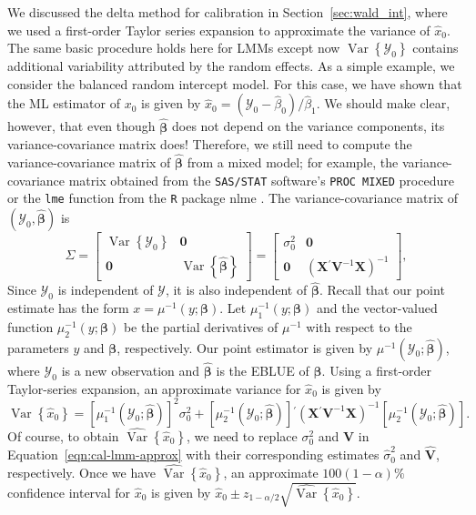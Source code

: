 \documentclass[cmfont,usenames,dvipsnames,leqno]{afit-etd}\usepackage[]{graphicx}\usepackage[]{color}
\newcommand{\code}[1]{\texttt{\small{#1}}}
\newcommand{\pkg}[1]{\textsf{\small{#1}}}
\newcommand{\trans}{\ensuremath{^\prime}}
\newcommand{\bc}[1]{\ensuremath{\bm{\mathcal{#1}}}}
\newcommand{\mc}[1]{\ensuremath{\mathcal{#1}}}
\newcommand{\wh}[1]{\ensuremath{\widehat{#1}}}
\newcommand{\var}{\operatorname{Var}}
\newcommand{\X}{\ensuremath{\bm{X}}}
\begin{document}
We discussed the delta method for calibration in Section~\ref{sec:wald_int}, where we used a first-order Taylor series expansion to approximate the variance of $\wh{x}_0$. The same basic procedure holds here for LMMs except now $\var\left\{\mc{Y}_0\right\}$ contains additional variability attributed by the random effects. As a simple example, we consider the balanced random intercept model. For this case, we have shown that the \ac{ML} estimator of $x_0$ is given by $\wh{x}_0 = \left(\mc{Y}_0 - \wh{\beta}_0\right)/\wh{\beta}_1$. We should make clear, however, that even though $\wh{\bm{\beta}}$ does not depend on the variance components, its variance-covariance matrix does! Therefore, we still need to compute the variance-covariance matrix of $\wh{\bm{\beta}}$ from a mixed model; for example, the variance-covariance matrix obtained from the \code{SAS/STAT} \citep{sas_program} software's \code{PROC MIXED} procedure or the \code{lme} function from the \code{R} package \pkg{nlme} \citep{pinheiro_nlme_2013}. The variance-covariance matrix of $\left(\mc{Y}_0, \wh{\bm{\beta}}\right)$ is
\begin{equation}
\label{eqn:Sigma}
\Sigma = \begin{bmatrix}
           \var\left\{\mc{Y}_0\right\} & \bm{0} \\
           \bm{0} & \var\left\{\wh{\bm{\beta}}\right\}
         \end{bmatrix} = \begin{bmatrix}
           \sigma_0^2 & \bm{0} \\
           \bm{0} & \left(\X\trans\bm{V}^{-1}\X\right)^{-1}
         \end{bmatrix},
\end{equation} 
Since $\mc{Y}_0$ is independent of $\bc{Y}$, it is also independent of $\wh{\bm{\beta}}$. Recall that our point estimate has the form $x = \mu^{-1}\left(y; \bm{\beta}\right)$. Let $\mu_1^{-1}\left(y; \bm{\beta}\right)$ and the vector-valued function $\mu_2^{-1}\left(y; \bm{\beta}\right)$ be the partial derivatives of $\mu^{-1}$ with respect to the parameters $y$ and $\bm{\beta}$, respectively. Our point estimator is given by $\mu^{-1}\left(\mc{Y}_0; \wh{\bm{\beta}}\right)$, where $\mc{Y}_0$ is a new observation and $\wh{\bm{\beta}}$ is the \ac{EBLUE} of $\bm{\beta}$. Using a first-order Taylor-series expansion, an approximate variance for $\wh{x}_0$ is given by
\begin{equation}
\label{eqn:cal-lmm-approx}
  \var\left\{\wh{x}_0\right\} = \left[\mu_1^{-1}\left(\mc{Y}_0; \wh{\bm{\beta}}\right)\right]^2\sigma_0^2 + \left[\mu_2^{-1}\left(\mc{Y}_0; \wh{\bm{\beta}}\right)\right]\trans\left(\X\trans\bm{V}^{-1}\X\right)^{-1}\left[\mu_2^{-1}\left(\mc{Y}_0; \wh{\bm{\beta}}\right)\right].
\end{equation}
Of course, to obtain $\wh{\var}\left\{\wh{x}_0\right\}$, we need to replace $\sigma_0^2$ and $\bm{V}$ in Equation~\eqref{eqn:cal-lmm-approx} with their corresponding estimates $\wh{\sigma}_0^2$ and $\wh{\bm{V}}$, respectively. Once we have $\wh{\var}\left\{\wh{x}_0\right\}$, an approximate $100(1-\alpha)\%$ confidence interval for $\wh{x}_0$ is given by $\wh{x}_0 \pm z_{1-\alpha/2}\sqrt{\wh{\var}\left\{\wh{x}_0\right\}}$.
\end{document}
